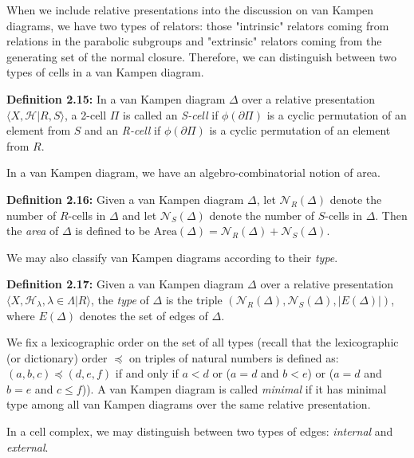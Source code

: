 \documentclass[12pt]{article}
\newcommand{\vs}{\vskip10pt}
\begin{document}
	When we include relative presentations into the discussion on van Kampen diagrams, we have two types of relators: those "intrinsic" relators coming from relations in the parabolic subgroups and "extrinsic" relators coming from the generating set of the normal closure. Therefore, we can distinguish between two types of cells in a van Kampen diagram. 
	
	\vs 
	
	\textbf{Definition 2.15: } In a van Kampen diagram $\Delta$ over a relative presentation $\langle X, \mathcal{H} \vert R, S \rangle$, a 2-cell $\Pi$ is called an \textit{S-cell} if $\phi(\partial \Pi)$ is a cyclic permutation of an element from $S$ and an \textit{R-cell} if $\phi(\partial \Pi)$ is a cyclic permutation of an element from $R$.

	\vs
	
	In a van Kampen diagram, we have an algebro-combinatorial notion of area.
	
	\vs 
	
	\textbf{Definition 2.16: } Given a van Kampen diagram $\Delta$, let $\mathcal{N}_R(\Delta)$ denote the number of $R$-cells in $\Delta$ and let $\mathcal{N}_S(\Delta)$ denote the number of $S$-cells in $\Delta$. Then the \textit{area} of $\Delta$ is defined to be $\text{Area}(\Delta) = \mathcal{N}_R(\Delta) + \mathcal{N}_S(\Delta)$.
	
	\vs 
	
	We may also classify van Kampen diagrams according to their \textit{type}. 
	
	\vs 
	
	\textbf{Definition 2.17: } Given a van Kampen diagram $\Delta$ over a relative presentation $\langle X, \mathcal{H}_{\lambda}, \lambda \in \Lambda \vert R \rangle $, the \textit{type} of $\Delta$ is the triple $(\mathcal{N}_{R}(\Delta), \mathcal{N}_S(\Delta), \vert E(\Delta) \vert)$, where $E(\Delta)$ denotes the set of edges of $\Delta$. 
	
	\vs 
	
	We fix a lexicographic order on the set of all types (recall that the lexicographic (or dictionary) order $\preccurlyeq$ on triples of natural numbers is defined as: $(a,b,c) \preccurlyeq (d,e,f)$ if and only if $a < d$ or ($a = d$ and $b < e$) or ($a = d$ and $b = e$ and $c \leq f$)). A van Kampen diagram is called \textit{minimal} if it has minimal type among all van Kampen diagrams over the same relative presentation. 
	
	\vs 
	
	In a cell complex, we may distinguish between two types of edges: \textit{internal} and \textit{external}. 
	
\end{document}
